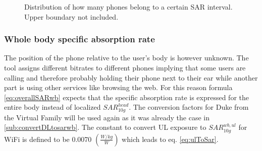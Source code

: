 

\begin{figure}
  \caption{Distribution of how many phones belong to a certain SAR interval. Upper boundary not included.}
  \label{chart:germanDatabase}
\end{figure}


\subsubsection{Whole body specific absorption rate}
The position of the phone relative to the user's body is however unknown. The tool assigns different bitrates to different phones implying 
that some users are calling and therefore probably holding their phone next to their ear while another part is using other services like browsing the web.
For this reason formula \ref{eq:overallSARwb} expects that the specific absorption rate is expressed for the entire body instead of localized $SAR^{head}_{10g}$.
The conversion factors for Duke from the Virtual Family will be used again as it was already the case in \ref{sub:convertDLtosarwb}. 
The constant to convert \gls{UL} exposure to $SAR^{wb,ul}_{10g}$
for WiFi is defined to be 0.0070 $\left(\frac{W/kg}{W}\right)$ \cite{J22_plets2015joint} which leads to eq. \ref{eq:ulToSar}.

